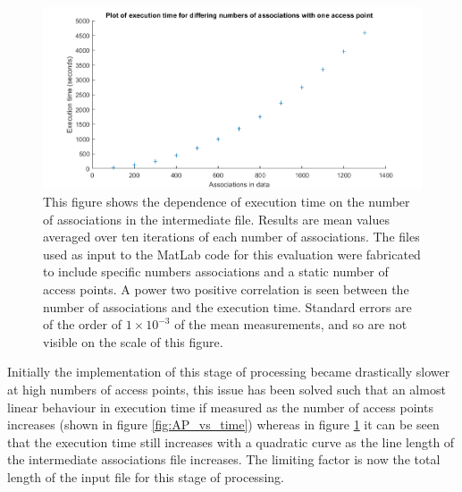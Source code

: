 \begin{figure}[h]
    \centering
    \includegraphics[width=\textwidth]{time_vs_lines.png}
    \caption{This figure shows the dependence of execution time on the number of associations in the intermediate file. Results are mean values averaged over ten iterations of each number of associations. The files used as input to the MatLab code for this evaluation were fabricated to include specific numbers associations and a static number of access points. A power two positive correlation is seen between the number of associations and the execution time. Standard errors are of the order of $1\times10^{-3}$ of the mean measurements, and so are not visible on the scale of this figure.}
    \label{fig:lines_vs_time}
\end{figure}

Initially the implementation of this stage of processing became drastically slower at high numbers of access points, this issue has been solved such that an almost linear behaviour in execution time if measured as the number of access points increases (shown in figure \ref{fig:AP_vs_time}) whereas in figure \ref{fig:lines_vs_time} it can be seen that the execution time still increases with a quadratic curve as the line length of the intermediate associations file increases. The limiting factor is now the total length of the input file for this stage of processing.

